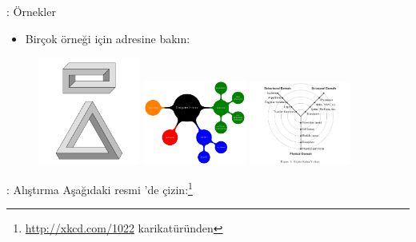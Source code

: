\documentclass[aspectratio=169]{beamer}
\begin{document}
\begin{frame}[fragile]{\insertsection: Örnekler}
\begin{itemize}
\item Birçok \tikzname{} örneği için  adresine bakın: 
\end{itemize}
\begin{figure}
\href{http://texample.net/tikz/examples/escher-brick-penrose-triangle/}{%
  \includegraphics[width=0.3\textwidth]{escher-brick-penrose-triangle}}
\href{http://texample.net/tikz/examples/computer-science-mindmap/}{%
  \includegraphics[width=0.3\textwidth]{computer-science-mindmap}}
\href{http://texample.net/tikz/examples/gajski-kuhn-y-chart/}{%
  \includegraphics[width=0.3\textwidth]{gajski-kuhn-y-chart}}
\end{figure}
\end{frame}

\begin{frame}[fragile]{\insertsection: Alıştırma}
Aşağıdaki resmi \tikzname{}'de çizin:\footnote{\url{http://xkcd.com/1022} karikatüründen}
\begin{figure}

\end{figure}
\end{frame}
\end{document}
